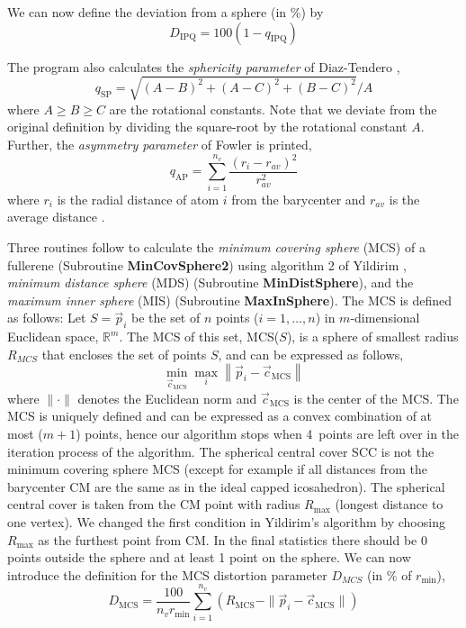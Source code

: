 \documentclass[article,a4paper,twoside]{memoir}
\newcommand{\funname}[1]{{\color{blue}\textbf{#1}}}
\begin{document}
 We can now define the deviation from a sphere (in \%) by
\begin{equation} 
D_{\textrm{IPQ}} =100\left(1-q_{\textrm{IPQ}} \right) 
\end{equation}

The program also calculates the \textit{sphericity parameter} of Diaz-Tendero \cite{Diaz},
\begin{equation}
\label{Diaz}
q_{\textrm{SP}} = \sqrt{(A-B)^2+(A-C)^2+(B-C)^2}/A 
\end{equation}
where $A \ge B \ge C$ are the rotational constants. Note that we deviate from the original definition by dividing 
the square-root by the rotational constant $A$. Further, the \textit{asymmetry parameter} of Fowler is printed,
\begin{equation}
\label{Diaz}
q_{\textrm{AP}} = \sum_{i=1}^{n_v}  \frac{(r_i-r_{av})^2}{r_{av}^2}
\end{equation}
where $r_i$ is the radial distance of atom $i$ from the barycenter and $r_{av}$ is the average distance \cite{Fowler2000}.

Three routines follow to calculate the \textit{minimum covering sphere} (MCS) of a fullerene (Subroutine
\funname{MinCovSphere2}) using algorithm 2 of Yildirim \cite{Yildirim08}, \textit{minimum distance
sphere} (MDS) (Subroutine \funname{MinDistSphere}), and the \textit{maximum inner sphere} (MIS) (Subroutine \funname{MaxInSphere}).
The MCS is defined as follows:
Let $S = \vec{p}_i$ be the set of $n$ points ($i=1,\ldots ,n$) in $m$-dimensional Euclidean space, 
$\mathbb{R}^m$. The MCS of this set, MCS($S$), is a sphere of smallest radius $R_{MCS}$ that encloses the set of points $S$,
and can be expressed as follows,
\begin{equation}
	\label{eq:MCS}
	\min\limits_{\vec{c}_{\mathrm{MCS}} } \max\limits_i \left\| \vec{p}_i -\vec{c}_{\mathrm{MCS}} \right\|  
\end{equation} 
where $\|\cdot\| $ denotes the Euclidean norm and $\vec{c}_{\mathrm{MCS}}$ is the center of the MCS. The MCS
is uniquely defined and can be expressed as a convex combination of at most 
($m+1$) points, hence our algorithm stops when 4~points are left over in the iteration process of the algorithm.
The spherical central cover SCC is not the minimum covering sphere MCS
(except for example if all distances from the barycenter CM are the same as in the
ideal capped icosahedron). The spherical central cover is taken from the
CM point with radius $R_{\mathrm{max}}$ (longest distance to one vertex).  We changed the first
condition in Yildirim's algorithm by choosing $R_{\mathrm{max}}$ as the furthest point from CM.
In the final statistics there should be 0 points outside the sphere and at least 1 point on the sphere.
We can now introduce the definition for the MCS distortion parameter $D_{MCS}$ (in \% of $r_{\mathrm{min}}$),
\begin{equation} \label{eq:DMCS}
D_{\mathrm{MCS}} =\frac{100}{n_vr_\mathrm{min}} \sum_{i=1}^{n_v} \left(R_{\mathrm{MCS}} - \|\vec{p}_i - \vec{c}_{\mathrm{MCS}}\|\right)
\end{equation} 
\end{document}
